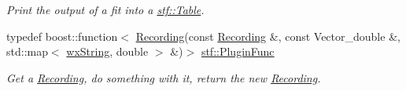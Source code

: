 \begin{DoxyCompactItemize}
\begin{DoxyCompactList}\small\item\em Print the output of a fit into a \hyperlink{classstf_1_1Table}{stf::Table}. \item\end{DoxyCompactList}\item 
\hypertarget{group__stfgen_gaa37601710b061d50b53ceeab1e7a9dd2}{
typedef boost::function$<$ \hyperlink{classRecording}{Recording}(const \hyperlink{classRecording}{Recording} \&, const Vector\_\-double \&, std::map$<$ \hyperlink{classwxString}{wxString}, double $>$ \&)$>$ \hyperlink{group__stfgen_gaa37601710b061d50b53ceeab1e7a9dd2}{stf::PluginFunc}}
\label{group__stfgen_gaa37601710b061d50b53ceeab1e7a9dd2}

\begin{DoxyCompactList}\small\item\em Get a \hyperlink{classRecording}{Recording}, do something with it, return the new \hyperlink{classRecording}{Recording}. \item\end{DoxyCompactList}\end{DoxyCompactItemize}
